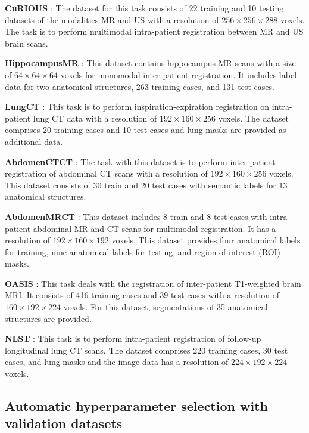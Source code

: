 \textbf{CuRIOUS} \citep{easyresect2020,xiao2017re,xiao2019evaluation}: The dataset for this task consists of 22 training and 10 testing datasets of the modalities MR and US with a resolution of $256\times256\times288$ voxels. The task is to perform multimodal intra-patient registration between MR and US brain scans.

\textbf{HippocampusMR} \citep{antonelli2022medical}: This dataset contains hippocampus MR scans with a size of $64\times64\times64$ voxels for monomodal inter-patient registration. It includes label data for two anatomical structures, 263 training cases, and 131 test cases.

\textbf{LungCT} \citep{hering2020}: This task is to perform inspiration-expiration registration on intra-patient lung CT data with a resolution of $192\times160\times256$ voxels. The dataset comprises 20 training cases and 10 test cases and lung masks are provided as additional data.

\textbf{AbdomenCTCT} \citep{xu2016evaluation}: The task with this dataset is to perform inter-patient registration of abdominal CT scans with a resolution of $192\times160\times256$ voxels. This dataset consists of 30 train and 20 test cases with semantic labels for 13 anatomical structures.

\textbf{AbdomenMRCT} \citep{akin2016kirc,linehan2016kirp,erickson2016lihc,clark2013cancer}: This dataset includes 8 train and 8 test cases with intra-patient abdominal MR and CT scans for multimodal registration. It has a resolution of $192\times160\times192$ voxels. This dataset provides four anatomical labels for training, nine anatomical labels for testing, and region of interest (ROI) masks.

\textbf{OASIS} \citep{marcus2007open}: This task deals with the registration of inter-patient T1-weighted brain MRI. It consists of 416 training cases and 39 test cases with a resolution of $160\times192\times224$ voxels. For this dataset, segmentations of 35 anatomical structures are provided.

\textbf{NLST} \citep{national2011national,national2011reduced,clark2013cancer}: This task is to perform intra-patient registration of follow-up longitudinal lung CT scans. The dataset comprises 220 training cases, 30 test cases, and lung masks and the image data has a resolution of $224\times192\times224$ voxels.

\subsection{Automatic hyperparameter selection with validation datasets}

